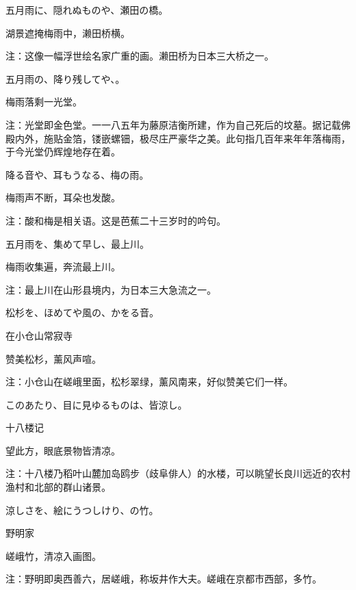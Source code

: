 \begin{haiku}
    {\FH 五月雨に、隠れぬものや、瀬田の橋。}

    {\FK 湖景遮掩梅雨中，濑田桥横。}

    {\FT 注：这像一幅浮世绘名家广重的画。濑田桥为日本三大桥之一。}
\end{haiku}

\begin{haiku}
    {\FH 五月雨の、降り残してや、。}

    {\FK 梅雨落剩一光堂。}

    {\FT 注：光堂即金色堂。一一八五年为藤原洁衡所建，作为自己死后的坟墓。据记载佛殿内外，施贴金箔，镂嵌螺钿，极尽庄严豪华之美。此句指几百年来年年落梅雨，于今光堂仍辉煌地存在着。}
\end{haiku}

\begin{haiku}
    {\FH 降る音や、耳もうなる、梅の雨。}

    {\FK 梅雨声不断，耳朵也发酸。}

    {\FT 注：酸和梅是相关语。这是芭蕉二十三岁时的吟句。}
\end{haiku}

\begin{haiku}
    {\FH 五月雨を、集めて早し、最上川。}

    {\FK 梅雨收集遍，奔流最上川。}

    {\FT 注：最上川在山形县境内，为日本三大急流之一。}
\end{haiku}

\begin{haiku}
    {\FH 松杉を、ほめてや風の、かをる音。}

    {\FK 在小仓山常寂寺}

    {\FK 赞美松杉，薰风声喧。}

    {\FT 注：小仓山在嵯峨里面，松杉翠绿，薰风南来，好似赞美它们一样。}
\end{haiku}

\begin{haiku}
    {\FH このあたり、目に見ゆるものは、皆涼し。}

    {\FK 十八楼记}

    {\FK 望此方，眼底景物皆清凉。}

    {\FT 注：十八楼乃稻叶山麓加岛鸥步（歧阜俳人）的水楼，可以眺望长良川远近的农村渔村和北部的群山诸景。}
\end{haiku}

\begin{haiku}
    {\FH 涼しさを、絵にうつしけり、の竹。}

    {\FK 野明家}

    {\FK 嵯峨竹，清凉入画图。}

    {\FT 注：野明即奥西善六，居嵯峨，称坂井作大夫。嵯峨在京都市西部，多竹。}
\end{haiku}

